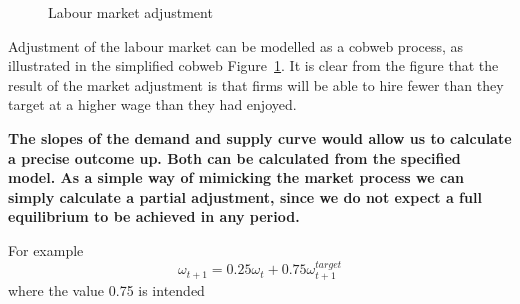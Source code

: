 \begin{figure}
    \centering
    \caption {Labour market adjustment}
    \label{fig:cobweb}
\end{figure}



Adjustment of  the labour market can be modelled as a cobweb process, as illustrated in the simplified cobweb Figure~\ref{fig:cobweb}. It is clear from the figure that the result of the market adjustment is that firms will be able to hire fewer than they target at a higher wage than they had enjoyed. 

\textbf{The slopes of the demand and supply curve would allow us to calculate a precise  outcome up. Both can be calculated  from the specified model. As a simple way of mimicking the market process we can simply calculate a partial adjustment, since we do not  expect a full equilibrium to be achieved in any period.}

For example
\begin{equation}
   \omega_{t+1}= 0.25 \omega_{t} +0.75 \omega^{target}_{t+1}
\end{equation}
where the value 0.75 is intended 

